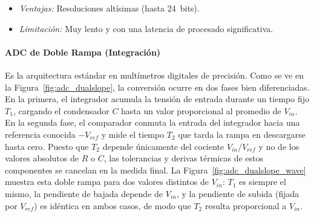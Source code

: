 \begin{itemize}
    \item \emph{Ventajas:} Resoluciones altísimas (hasta \qty{24}{bits}).
    \item \emph{Limitación:} Muy lento y con una latencia de procesado significativa.
\end{itemize}

\paragraph{ADC de Doble Rampa (Integración)}

\begin{marginfigure}
    \centering
    \shorthandoff{>}
    \caption[ADC de doble rampa.]{ADC de Doble Rampa. El tiempo de descarga es directamente proporcional al voltaje medio de entrada, eliminando ruidos de alta frecuencia.}\label{fig:adc_dualslope}
\end{marginfigure}

Es la arquitectura estándar en multí\-metros digitales de precisión. Como se ve en la Figura~\ref{fig:adc_dualslope}, la conversión ocurre en dos fases bien diferenciadas. En la primera, el integrador acumula la tensión de entrada durante un tiempo fijo $T_1$, cargando el condensador $C$ hasta un valor proporcional al promedio de $V_{in}$. En la segunda fase, el comparador conmuta la entrada del integrador hacia una referencia conocida $-V_{ref}$ y mide el tiempo $T_2$ que tarda la rampa en descargarse hasta cero. Puesto que $T_2$ depende únicamente del cociente $V_{in}/V_{ref}$ y no de los valores absolutos de $R$ o $C$, las tolerancias y derivas térmicas de estos componentes se cancelan en la medida final. La Figura~\ref{fig:adc_dualslope_wave} muestra esta doble rampa para dos valores distintos de $V_{in}$: $T_1$ es siempre el mismo, la pendiente de bajada depende de $V_{in}$, y la pendiente de subida (fijada por $V_{ref}$) es idéntica en ambos casos, de modo que $T_2$ resulta proporcional a $V_{in}$.

